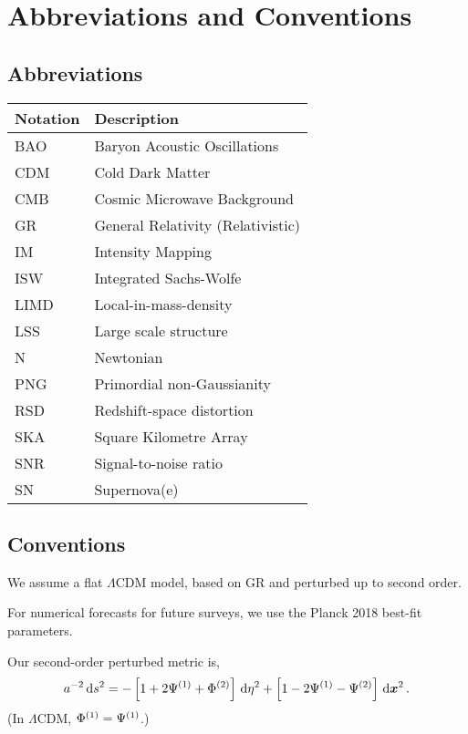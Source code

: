 \chapter*{Abbreviations and Conventions}
\label{chapter:conventions}
\section*{}
\singlespacing

\section*{Abbreviations}
\setlength{\tabcolsep}{14pt}
\begin{center}
\begin{tabular}{l | l}
	\textbf{Notation} & \textbf{Description} \\
	\hline
	BAO & Baryon Acoustic Oscillations \\
	CDM & Cold Dark Matter \\
	CMB & Cosmic Microwave Background \\
	GR & General Relativity (Relativistic) \\
	IM & Intensity Mapping \\
	ISW & Integrated Sachs-Wolfe \\
	LIMD & Local-in-mass-density \\
	LSS & Large scale structure \\
	N & Newtonian \\
	PNG & Primordial non-Gaussianity \\
	RSD & Redshift-space distortion \\
	SKA & Square Kilometre Array \\
	SNR & Signal-to-noise ratio \\
	SN & Supernova(e)
\end{tabular}
\end{center}
\section*{Conventions}

We assume a flat $\Lambda$CDM model, based on GR and perturbed up to second order. 

For numerical forecasts for future surveys, we use the Planck 2018 best-fit parameters.

Our second-order perturbed metric is, 
\begin{equation*}
	a^{-2} \,\mathrm{d} s^2 = - \left[ 1 + 2 \Psi^{(1)} + \Phi^{(2)} \right] \,\mathrm{d} \eta^2 + \left[ 1 - 2 \Psi^{(1)} - \Psi^{(2)} \right] \,\mathrm{d} \bm {x}^2\,.
\end{equation*}
(In $\Lambda$CDM, $\Phi^{(1)} = \Psi^{(1)}$.)

